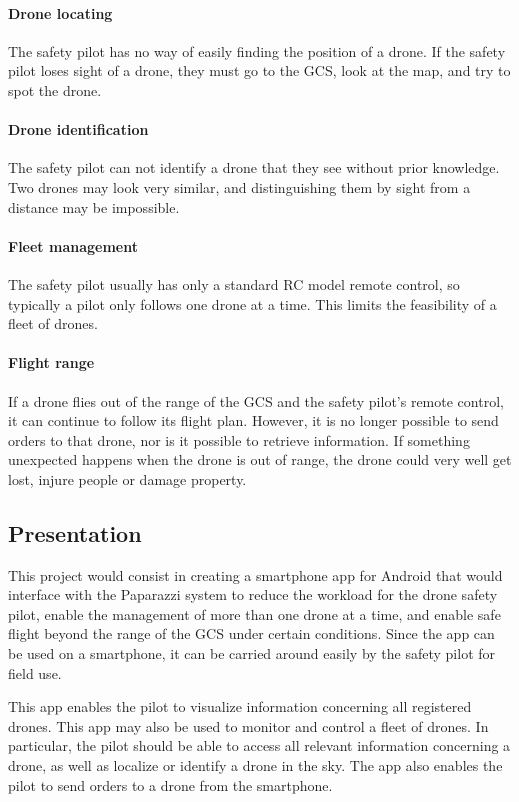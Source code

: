\documentclass[conference]{IEEEtran}
\begin{document}
\paragraph{Drone locating} The safety pilot has no way of easily finding the position of a drone. If the safety pilot loses sight of a drone, they must go to the GCS, look at the map, and try to spot the drone. 

\paragraph{Drone identification} The safety pilot can not identify a drone that they see without prior knowledge. Two drones may look very similar, and distinguishing them by sight from a distance may be impossible. 

\paragraph{Fleet management} The safety pilot usually has only a standard RC model remote control, so typically a pilot only follows one drone at a time. This limits the feasibility of a fleet of drones. 

\paragraph{Flight range} If a drone flies out of the range of the GCS and the safety pilot's remote control, it can continue to follow its flight plan. However, it is no longer possible to send orders to that drone, nor is it possible to retrieve information. If something unexpected happens when the drone is out of range, the drone could very well get lost, injure people or damage property.


\subsection{Presentation}
This project would consist in creating a smartphone app for Android that would interface with the Paparazzi system to reduce the workload for the drone safety pilot, enable the management of more than one drone at a time, and enable safe flight beyond the range of the GCS under certain conditions. Since the app can be used on a smartphone, it can be carried around easily by the safety pilot for field use. 

This app enables the pilot to visualize information concerning all registered drones. This app may also be used to monitor and control a fleet of drones. In particular, the pilot should be able to access all relevant information concerning a drone, as well as localize or identify a drone in the sky. The app also enables the pilot to send orders to a drone from the smartphone. 
\end{document}
